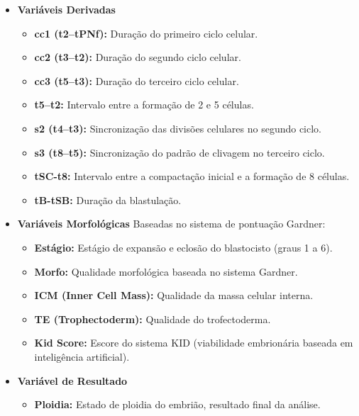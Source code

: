 \begin{apendicesenv}
\begin{itemize}
  \item \textbf{Variáveis Derivadas}
  \begin{itemize}
    \item \textbf{cc1 (t2–tPNf):} Duração do primeiro ciclo celular.
    \item \textbf{cc2 (t3–t2):} Duração do segundo ciclo celular.
    \item \textbf{cc3 (t5–t3):} Duração do terceiro ciclo celular.
    \item \textbf{t5–t2:} Intervalo entre a formação de 2 e 5 células.
    \item \textbf{s2 (t4–t3):} Sincronização das divisões celulares no segundo ciclo.
    \item \textbf{s3 (t8–t5):} Sincronização do padrão de clivagem no terceiro ciclo.
    \item \textbf{tSC-t8:} Intervalo entre a compactação inicial e a formação de 8 células.
    \item \textbf{tB-tSB:} Duração da blastulação.
  \end{itemize}
\end{itemize}

\begin{itemize}
  \item \textbf{Variáveis Morfológicas}
  Baseadas no sistema de pontuação Gardner:
  \begin{itemize}
    \item \textbf{Estágio:} Estágio de expansão e eclosão do blastocisto (graus 1 a 6).
    \item \textbf{Morfo:} Qualidade morfológica baseada no sistema Gardner.
    \item \textbf{ICM (Inner Cell Mass):} Qualidade da massa celular interna.
    \item \textbf{TE (Trophectoderm):} Qualidade do trofectoderma.
    \item \textbf{Kid Score:} Escore do sistema KID (viabilidade embrionária baseada em inteligência artificial).
  \end{itemize}
\end{itemize}

\begin{itemize}
  \item \textbf{Variável de Resultado}
  \begin{itemize}
    \item \textbf{Ploidia:} Estado de ploidia do embrião, resultado final da análise.
  \end{itemize}
\end{itemize}



\end{apendicesenv}
